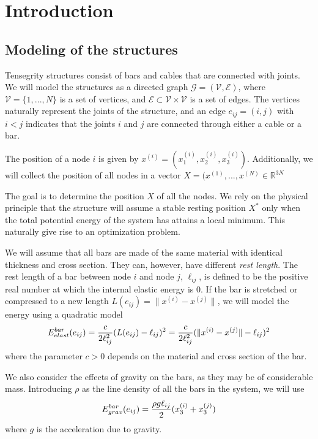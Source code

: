 \section{Introduction}
\subsection{Modeling of the structures}
Tensegrity structures consist of bars and cables that are connected with joints. We will model the structures as a directed graph $\mathcal{G} = (\mathcal{V},\mathcal{E})$, where $\mathcal{V} = \{1,...,N\}$ is a set of vertices, and $\mathcal{E} \subset \mathcal{V} \times \mathcal{V}$ is a set of edges. The vertices naturally represent the joints of the structure, and an edge $e_{ij} = (i,j)$ with $i < j$ indicates that the joints $i$ and $j$ are connected through either a cable or a bar.

The position of a node $i$ is given by $x^{(i)} = (x_1^{(i)},x_2^{(i)},x_3^{(i)})$. Additionally, we will collect the position of all nodes in a vector $X = (x^{(1)},...,x^{(N)} \in \mathbb{R}^{3N}$

The goal is to determine the position $X$ of all the nodes. We rely on the physical principle that the structure will assume a stable resting position $X^*$ only when the total potential energy of the system has attains a local minimum. This naturally give rise to an optimization problem.

We will assume that all bars are made of the same material with identical thickness and cross section. They can, however, have different \emph{rest length}. The rest length of a bar between node $i$ and node $j$, $\ell_{ij}$, is defined to be the positive real number at which the internal elastic energy is $0$. If the bar is stretched or compressed to a new length $L(e_{ij})=\lVert x^{(i)} - x^{(j)}\rVert$, we will model the energy using a quadratic model
\begin{equation}
    E^{bar}_{elast}(e_{ij}) = \frac{c}{2\ell_{ij}^2}(L(e_{ij}) - \ell_{ij})^2 = \frac{c}{2 \ell_{ij}^2}(\lVert x^{(i)} - x^{(j)}\rVert - \ell_{ij})^2
    \label{barElast}
\end{equation}
where the parameter $c > 0$ depends on the material and cross section of the bar. 

We also consider the effects of gravity on the bars, as they may be of considerable mass. Introducing $\rho$ as the line density of all the bars in the system, we will use
\begin{equation}
    E^{bar}_{grav}(e_{ij}) = \frac{\rho g \ell_{ij}}{2}(x_3^{(i)}+x_3^{(j)})
    \label{barGrav}
\end{equation}
where $g$ is the acceleration due to gravity.

